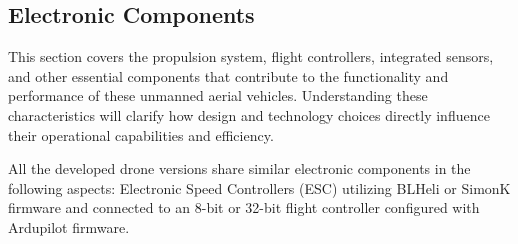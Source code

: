 \documentclass[conference]{IEEEtran}
\begin{document}
\subsection{Electronic Components}

This section covers the propulsion system, flight controllers, integrated sensors, and other essential components that contribute to the functionality and performance of these unmanned aerial vehicles. Understanding these characteristics will clarify how design and technology choices directly influence their operational capabilities and efficiency.

All the developed drone versions share similar electronic components in the following aspects: Electronic Speed Controllers (ESC) utilizing BLHeli or SimonK firmware and connected to an 8-bit or 32-bit flight controller configured with Ardupilot firmware.
\end{document}

